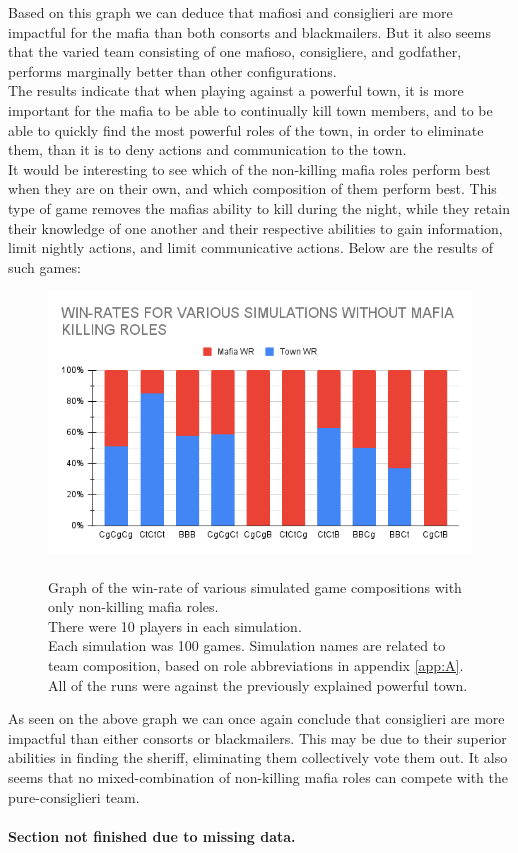 \vspace{-5px}Based on this graph we can deduce that mafiosi and
consiglieri are more
impactful for the mafia than both consorts and blackmailers. But it also seems
that the varied team consisting of one mafioso, consigliere, and godfather,
performs marginally better than other configurations. \\
The results indicate that when playing against a powerful town, it is more
important for the mafia to be able to continually kill town members, and to be
able to quickly find the most powerful roles of the town, in order to eliminate
them, than it is to deny actions and communication to the town. \\
It would be interesting to see which of the non-killing mafia roles perform
best when they are on their own, and which composition of them perform best.
This type of game removes the mafias ability to kill during the night, while
they retain their knowledge of one another and their respective abilities to
gain information, limit nightly actions, and limit communicative actions. Below
are the results of such games:
\begin{figure}[H]
    \includegraphics[width=1\linewidth]{figures/Winrates_NonKilling}
    \caption{\\Graph of the win-rate of various simulated game compositions
        with only non-killing mafia roles.\\
        There were 10 players in each simulation.\\
        Each simulation was 100 games.
        Simulation names are related to team composition, based on role
        abbreviations in appendix \ref{app:A}.\\
        All of the runs were against the previously explained powerful town.}
    \label{fig:VariousSimulationsNonKilling}
\end{figure}
\vspace{-5px} As seen on the above graph we can once again conclude that
consiglieri are more impactful than either consorts or blackmailers. This may
be due to their superior abilities in finding the sheriff, eliminating them
collectively vote them out. It also seems that no mixed-combination of
non-killing mafia roles can compete with the pure-consiglieri team. \\\\
\textbf{Section not finished due to missing data.}
